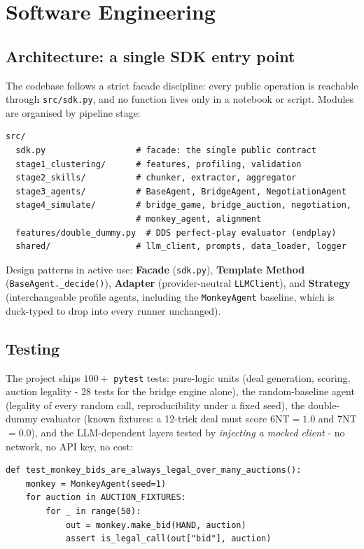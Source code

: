 \documentclass[11pt, a4paper, oneside, openany]{report}
\begin{document}
\chapter{Software Engineering}
\label{ch:se}

\section{Architecture: a single SDK entry point}
The codebase follows a strict facade discipline: every public operation is
reachable through \texttt{src/sdk.py}, and no function lives only in a
notebook or script. Modules are organised by pipeline stage:

\begin{lstlisting}
src/
  sdk.py                  # facade: the single public contract
  stage1_clustering/      # features, profiling, validation
  stage2_skills/          # chunker, extractor, aggregator
  stage3_agents/          # BaseAgent, BridgeAgent, NegotiationAgent
  stage4_simulate/        # bridge_game, bridge_auction, negotiation,
                          # monkey_agent, alignment
  features/double_dummy.py  # DDS perfect-play evaluator (endplay)
  shared/                 # llm_client, prompts, data_loader, logger
\end{lstlisting}

Design patterns in active use: \textbf{Facade} (\texttt{sdk.py}),
\textbf{Template Method} (\texttt{BaseAgent.\_decide()}),
\textbf{Adapter} (provider-neutral \texttt{LLMClient}),
and \textbf{Strategy} (interchangeable profile agents, including the
\texttt{MonkeyAgent} baseline, which is duck-typed to drop into every runner
unchanged).

\section{Testing}
The project ships $100{+}$ \texttt{pytest} tests: pure-logic units (deal
generation, scoring, auction legality - 28 tests for the bridge engine
alone), the random-baseline agent (legality of every random call,
reproducibility under a fixed seed), the double-dummy evaluator (known
fixtures: a 12-trick deal must score $6$NT${}=1.0$ and $7$NT${}=0.0$), and
the LLM-dependent layers tested by \emph{injecting a mocked client} - no
network, no API key, no cost:

\begin{lstlisting}
def test_monkey_bids_are_always_legal_over_many_auctions():
    monkey = MonkeyAgent(seed=1)
    for auction in AUCTION_FIXTURES:
        for _ in range(50):
            out = monkey.make_bid(HAND, auction)
            assert is_legal_call(out["bid"], auction)
\end{lstlisting}
\end{document}
